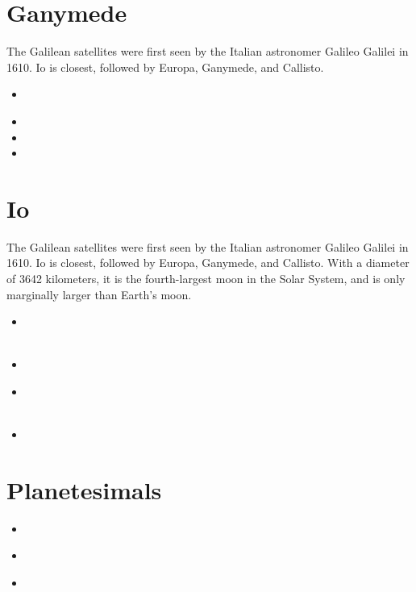 \section{Ganymede}

The Galilean satellites were first seen by the Italian astronomer Galileo Galilei in 1610. 
Io is closest, followed by Europa, Ganymede, and Callisto.

\begin{small}
\begin{itemize}
\item[1988]
 \\ 
\item[1990]
\item[\twothousandsix]
\item[\twothousandfourteen]
\end{itemize}
\end{small}


\section{Io}

The Galilean satellites were first seen by the Italian astronomer Galileo Galilei in 1610. 
Io is closest, followed by Europa, Ganymede, and Callisto.
With a diameter of 3642 kilometers, it is the fourth-largest moon in the Solar System, 
and is only marginally larger than Earth's moon.

\begin{small}
\begin{itemize}
\item[\twothousandone]
 \\ 
 \\
\item[\twothousandthirteen] 
\item[\twothousandtwenty] 
 \\ 
 \\
\item[\twothousandtwentytwo] 
\end{itemize}
\end{small}

\section{Planetesimals}

\begin{small}
\begin{itemize}
\item[\twothousandfourteen]
\item[\twothousandnineteen]
 \\
\item[\twothousandtwentyone]
\end{itemize}
\end{small}


